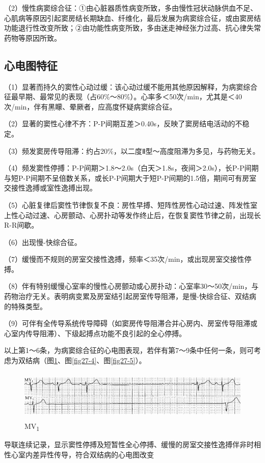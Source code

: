 （2）慢性病窦综合征：①由心脏器质性病变所致，多由慢性冠状动脉供血不足、心肌病等原因引起窦房结长期缺血、纤维化，最后发展为病窦综合征，或由窦房结功能退行性改变所致；②由功能性病变所致，多由迷走神经张力过高、抗心律失常药物等原因所致。

\protect\hypertarget{text00034.htmlux5cux23subid410}{}{}

\subsection{心电图特征}

（1）显著而持久的窦性心动过缓：该心动过缓不能用其他原因解释，为病窦综合征最早期、最常见的表现（占60\%～80\%）。心率多＜50次/min，尤其是＜40次/min，伴有黑矇、晕厥者，应高度怀疑病窦综合征。

（2）显著的窦性心律不齐：P-P间期互差＞0.40s，反映了窦房结电活动的不稳定。

（3）频发窦房传导阻滞：约占20\%，以二度Ⅱ型～高度阻滞为多见，与药物无关。

（4）频发窦性停搏：P-P间期＞1.8～2.0s（白天＞1.8s，夜间＞2.0s），长P-P间期与短P-P间期不呈倍数关系，或长P-P间期大于短P-P间期的1.5倍，期间可有房室交接性逸搏或室性逸搏出现。

（5）心脏复律后窦性节律恢复不良：房性早搏、短阵性房性心动过速、阵发性室上性心动过速、心房颤动、心房扑动等发作终止后，在恢复窦性节律之前，出现长R-R间歇。

（6）出现慢-快综合征。

（7）缓慢而不规则的房室交接性逸搏，频率＜35次/min，或出现房室交接性停搏。

（8）伴有特别缓慢心室率的慢性心房颤动或心房扑动：心室率30～50次/min，与药物治疗无关。表明病变累及房室结引起房室传导阻滞，是慢-快综合征、双结病的特殊类型。

（9）可伴有全传导系统传导障碍（如窦房传导阻滞合并心房内、房室传导阻滞或心室内传导阻滞）、下级起搏点功能不良引起的全心停搏。

以上第1～6条，为病窦综合征的心电图表现，若伴有第7～9条中任何一条，则可考虑为双结病（图\ref{fig27-3}、图\ref{fig27-4}、图\ref{fig27-5}）。

\begin{figure}[!htbp]
 \centering
 \includegraphics[width=5.58333in,height=0.94792in]{./images/Image00458.jpg}
 \captionsetup{justification=centering}
 \caption{MV\textsubscript{1}}
 \label{fig27-3}
  \end{figure} 
导联连续记录，显示窦性停搏及短暂性全心停搏、缓慢的房室交接性逸搏伴非时相性心室内差异性传导，符合双结病的心电图改变

